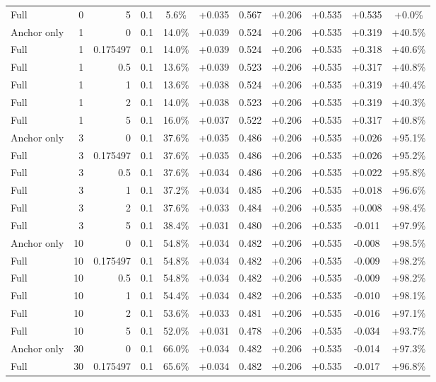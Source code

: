 \begin{table}[htbp]
\begin{tabular}{lrrrccccccc}
Full & 0 & 5 & 0.1 & 5.6\% & +0.035 & 0.567 & +0.206 & +0.535 & +0.535 & +0.0\% \\
Anchor only & 1 & 0 & 0.1 & 14.0\% & +0.039 & 0.524 & +0.206 & +0.535 & +0.319 & +40.5\% \\
Full & 1 & 0.175497 & 0.1 & 14.0\% & +0.039 & 0.524 & +0.206 & +0.535 & +0.318 & +40.6\% \\
Full & 1 & 0.5 & 0.1 & 13.6\% & +0.039 & 0.523 & +0.206 & +0.535 & +0.317 & +40.8\% \\
Full & 1 & 1 & 0.1 & 13.6\% & +0.038 & 0.524 & +0.206 & +0.535 & +0.319 & +40.4\% \\
Full & 1 & 2 & 0.1 & 14.0\% & +0.038 & 0.523 & +0.206 & +0.535 & +0.319 & +40.3\% \\
Full & 1 & 5 & 0.1 & 16.0\% & +0.037 & 0.522 & +0.206 & +0.535 & +0.317 & +40.8\% \\
Anchor only & 3 & 0 & 0.1 & 37.6\% & +0.035 & 0.486 & +0.206 & +0.535 & +0.026 & +95.1\% \\
Full & 3 & 0.175497 & 0.1 & 37.6\% & +0.035 & 0.486 & +0.206 & +0.535 & +0.026 & +95.2\% \\
Full & 3 & 0.5 & 0.1 & 37.6\% & +0.034 & 0.486 & +0.206 & +0.535 & +0.022 & +95.8\% \\
Full & 3 & 1 & 0.1 & 37.2\% & +0.034 & 0.485 & +0.206 & +0.535 & +0.018 & +96.6\% \\
Full & 3 & 2 & 0.1 & 37.6\% & +0.033 & 0.484 & +0.206 & +0.535 & +0.008 & +98.4\% \\
Full & 3 & 5 & 0.1 & 38.4\% & +0.031 & 0.480 & +0.206 & +0.535 & -0.011 & +97.9\% \\
Anchor only & 10 & 0 & 0.1 & 54.8\% & +0.034 & 0.482 & +0.206 & +0.535 & -0.008 & +98.5\% \\
Full & 10 & 0.175497 & 0.1 & 54.8\% & +0.034 & 0.482 & +0.206 & +0.535 & -0.009 & +98.2\% \\
Full & 10 & 0.5 & 0.1 & 54.8\% & +0.034 & 0.482 & +0.206 & +0.535 & -0.009 & +98.2\% \\
Full & 10 & 1 & 0.1 & 54.4\% & +0.034 & 0.482 & +0.206 & +0.535 & -0.010 & +98.1\% \\
Full & 10 & 2 & 0.1 & 53.6\% & +0.033 & 0.481 & +0.206 & +0.535 & -0.016 & +97.1\% \\
Full & 10 & 5 & 0.1 & 52.0\% & +0.031 & 0.478 & +0.206 & +0.535 & -0.034 & +93.7\% \\
Anchor only & 30 & 0 & 0.1 & 66.0\% & +0.034 & 0.482 & +0.206 & +0.535 & -0.014 & +97.3\% \\
Full & 30 & 0.175497 & 0.1 & 65.6\% & +0.034 & 0.482 & +0.206 & +0.535 & -0.017 & +96.8\% \\

\end{tabular}
\end{table}
